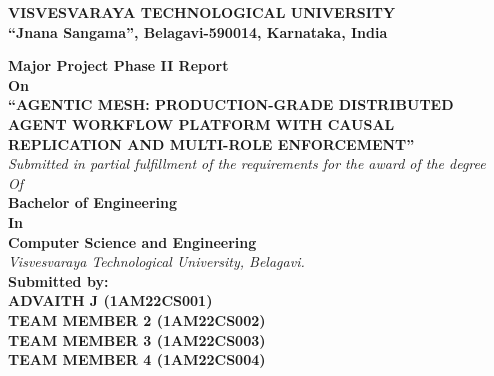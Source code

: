 \documentclass[12pt,a4paper]{report}
\begin{document}
\begin{titlepage}
\thispagestyle{empty}
\begin{center}
    {\large \textbf{VISVESVARAYA TECHNOLOGICAL UNIVERSITY}}\\[2pt]
    {\normalsize \textbf{“Jnana Sangama”, Belagavi-590014, Karnataka, India}}\\[14pt]

    \vspace{8pt}
    \vspace{12pt}

    {\large \textbf{Major Project Phase II Report}}\\[4pt]
    {\normalsize \textbf{On}}\\[10pt]

    {\large \textbf{\textcolor{red!70!black}{“AGENTIC MESH: PRODUCTION-GRADE DISTRIBUTED AGENT WORKFLOW PLATFORM WITH CAUSAL REPLICATION AND MULTI-ROLE ENFORCEMENT”}}}\\[14pt]

    {\small \textit{Submitted in partial fulfillment of the requirements for the award of the degree}}\\[3pt]
    {\small \textit{Of}}\\[4pt]
    {\large \textbf{Bachelor of Engineering}}\\[3pt]
    {\large \textbf{In}}\\[3pt]
    {\large \textbf{Computer Science and Engineering}}\\[3pt]
    {\small \textit{Visvesvaraya Technological University, Belagavi.}}\\[14pt]

    {\small \textbf{Submitted by:}}\\[5pt]
    {\normalsize \textbf{\textcolor{red!70!black}{ADVAITH J (1AM22CS001)}}}\\[3pt]
    {\normalsize \textbf{\textcolor{red!70!black}{TEAM MEMBER 2 (1AM22CS002)}}}\\[3pt]
    {\normalsize \textbf{\textcolor{red!70!black}{TEAM MEMBER 3 (1AM22CS003)}}}\\[3pt]
    {\normalsize \textbf{\textcolor{red!70!black}{TEAM MEMBER 4 (1AM22CS004)}}}\\[14pt]


\end{center}
\end{titlepage}
\end{document}
